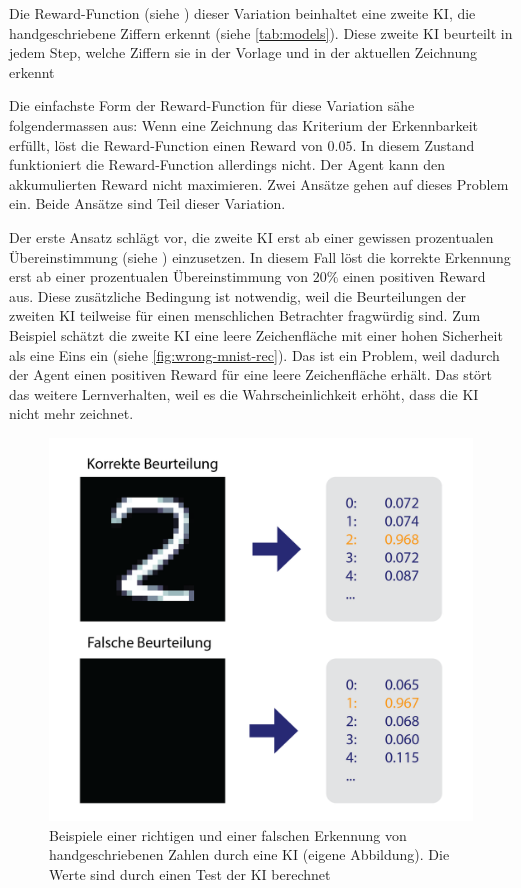 Die Reward-Function (siehe ) dieser Variation beinhaltet
eine zweite KI, die handgeschriebene Ziffern erkennt (siehe
\autoref{tab:models}). Diese zweite KI beurteilt in jedem Step, welche
Ziffern sie in der Vorlage und in der aktuellen
Zeichnung erkennt
 
Die einfachste Form der Reward-Function für diese Variation sähe
folgendermassen aus: Wenn eine Zeichnung das Kriterium der Erkennbarkeit
erfüllt, löst die Reward-Function einen Reward von $0.05$. In diesem Zustand
funktioniert die Reward-Function allerdings nicht. Der Agent kann den
akkumulierten Reward nicht maximieren. Zwei Ansätze gehen auf dieses Problem
ein. Beide Ansätze sind Teil dieser Variation.
 
Der erste Ansatz schlägt vor, die zweite KI erst ab einer gewissen prozentualen
Übereinstimmung (siehe ) einzusetzen. In diesem Fall
löst die korrekte Erkennung erst ab einer prozentualen Übereinstimmung von
$20\%$ einen positiven Reward aus. Diese zusätzliche Bedingung ist notwendig,
weil die Beurteilungen der zweiten KI teilweise für einen menschlichen
Betrachter fragwürdig sind. Zum Beispiel schätzt die zweite KI eine leere
Zeichenfläche mit einer hohen Sicherheit als eine Eins ein (siehe
\autoref{fig:wrong-mnist-rec}). Das ist ein Problem, weil dadurch der Agent
einen positiven Reward für eine leere Zeichenfläche erhält. Das stört das
weitere Lernverhalten, weil es die Wahrscheinlichkeit erhöht, dass die KI nicht
mehr zeichnet.
 
\begin{figure}[!ht]
 \centering
 \includegraphics[width=\textwidth]{images/methode/wrong-mnist-rec.png}
 \caption{Beispiele einer richtigen und einer falschen Erkennung von handgeschriebenen Zahlen durch eine KI (eigene Abbildung). Die Werte sind durch einen Test der KI berechnet}\label{fig:wrong-mnist-rec}
\end{figure}
 

